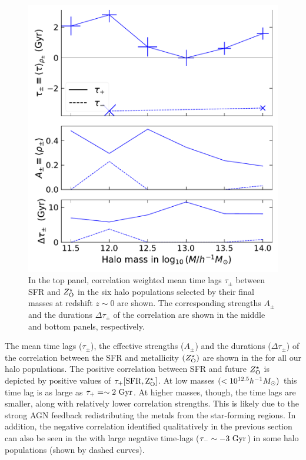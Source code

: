 \begin{figure}[htbp]
\centering
\includegraphics[width=.49\linewidth]{plots/dynam_relxn/shift_betw_SFR-Z(O)_SFreg_fullcorr.pdf}
\caption{In the top panel, correlation weighted mean time lags $\tau_{\pm}$ between SFR and $Z^{\star}_{\rm{O}}$ in the six halo populations selected by their final masses at redshift $z\sim 0$ are shown. The corresponding strengths $A_{\pm}$ and the durations $\Delta \tau_{\pm}$ of the correlation are shown in the middle and bottom panels, respectively.}
\label{fig:dynam-correl-sfr-ZOsfr-timeshift-all}
\end{figure}

The mean time lags ($\tau_{\pm}$), the effective strengths ($A_{\pm}$) and the durations ($\Delta\tau_{\pm}$) of the correlation between the SFR and metallicity $(Z^{\star}_{\rm{O}})$ are shown in the  for all our halo populations. 
The positive correlation between SFR and future $Z^{\star}_{\rm{O}}$ is depicted by positive values of $\tau_{+}[\rm{SFR}, Z^{\star}_{\rm{O}}]$. At low masses $(<10^{12.5}h^{-1}M_{\odot})$ this time lag is as large as $\tau_{+}=\sim 2 ~\rm{Gyr}$. At higher masses, though, the time lags are smaller, along with relatively lower correlation strengths. This is likely due to the strong AGN feedback redistributing the metals from the star-forming regions. In addition, the negative correlation identified qualitatively in the previous section can also be seen in the  with large negative time-lags ($\tau_{-} \sim -3~ \rm{Gyr}$) in some halo populations (shown by dashed curves).



